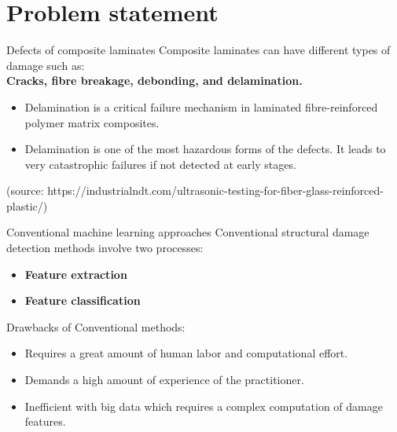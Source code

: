 \documentclass[10pt,aspectratio=169]{beamer} %
\begin{document}
\section{Problem statement}
\begin{frame}{Defects of composite laminates}
	\small
	Composite laminates can have different types of damage such as: \\
	\textbf{Cracks, fibre breakage, debonding, and delamination.} \\ 
	\begin{minipage}[c]{.40\textwidth}
		\begin{itemize}
			\footnotesize
			\item Delamination is a critical failure mechanism in laminated fibre-reinforced polymer matrix composites.
			\item Delamination is one of the most hazardous forms of the defects. 
			It leads to very catastrophic failures if not detected at early stages.
		\end{itemize}
	\end{minipage}
	\hfill
	\begin{minipage}[c]{0.50\textwidth}
		\tiny
		(source: https://industrialndt.com/ultrasonic-testing-for-fiber-glass-reinforced-plastic/)
	\end{minipage}
\end{frame}
\begin{frame}{Conventional machine learning approaches}
	Conventional structural damage detection methods involve two processes:
	\begin{itemize}
		\item \textbf{Feature extraction}
		\item \textbf{Feature classification}
	\end{itemize}
		Drawbacks of Conventional methods:
	\begin{itemize}
		\item Requires a great amount of human labor and computational effort.
		\item Demands a high amount of experience of the practitioner.
		\item Inefficient with big data which requires a complex computation of damage features. 
	\end{itemize}
\end{frame}
\end{document}

